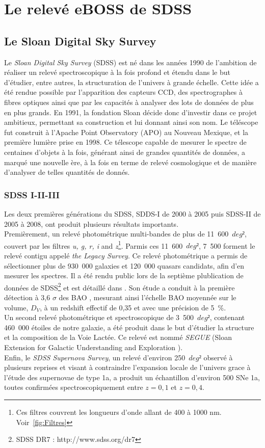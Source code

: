 \documentclass[11pt, twoside, a4paper, openright]{report}
\begin{document}
\chapter{Le relevé eBOSS de SDSS}

\section{Le Sloan Digital Sky Survey}


Le \emph{Sloan Digital Sky Survey} (SDSS) est né dans les années 1990 de l'ambition de réaliser un relevé spectroscopique à la fois profond et étendu dans le but d'étudier, entre autres, la structuration de l'univers à grande échelle. Cette idée a été rendue possible par l'apparition des capteurs CCD, des spectrographes à fibres optiques ainsi que par les capacités à analyser des lots de données de plus en plus grands. En 1991, la fondation Sloan décide donc d'investir dans ce projet ambitieux, permettant sa construction et lui donnant ainsi son nom. 
Le téléscope fut construit à l'Apache Point Observatory (APO) au Nouveau Mexique, et la première lumière prise en 1998. Ce télescope capable de mesurer le spectre de centaines d'objets à la fois, générant ainsi de grandes quantités de données, a marqu\'e une nouvelle ère, à la fois en terme de relevé cosmologique et de manière d'analyser de telles quantités de donnés.

\subsection{SDSS I-II-III}
Les deux premières générations du SDSS, SDDS-I de 2000 à 2005 puis SDSS-II de 2005 à 2008, ont produit plusieurs résultats importants.\\
Premièrement, un relevé photométrique multi-bandes de plus de 11~600~$deg²$, couvert par les filtres \emph{u, g, r, i} and \emph{z}\footnote{Ces filtres couvrent les longueurs d'onde allant de 400 à 1000 nm. Voir~\ref{fig:Filtres}}. Parmis ces 11~600~$deg²$, 7~500 forment le relevé contigu appelé \emph{the Legacy Survey}. Ce relevé photométrique a permis de sélectionner plus de 930~000 galaxies et 120~000 quasars candidats, afin d'en mesurer les spectres. Il a été rendu public lors de la septième plublication de données de SDSS\footnote{SDSS DR7 : http://www.sdss.org/dr7} et est détaillé dans \cite{Abazajian2008}. Son étude a conduit à la première détection à 3,6 $\sigma$ des BAO \cite{Eisenstein2005}, mesurant ainsi l'échelle BAO moyennée sur le volume, $D_V$, à un redshift effectif de 0,35 et avec une précision de 5~\%. \\
Un second relevé photométrique et spectroscopique de 3~500~$deg²$, contenant 460~000 étoiles de notre galaxie, a été produit dans le but d'étudier la structure et la composition de la Voie Lactée. Ce relevé est nommé \emph{SEGUE} (Sloan Extension for Galactic Understanding and Exploration \cite{Collaboration2009}).\\
Enfin, le \emph{SDSS Supernova Survey}, un relevé d'environ 250~$deg²$ observé à plusieurs reprises et visant à contraindre l'expansion locale de l'univers grace à l'étude des supernovae de type 1a, a produit un échantillon d'environ 500 SNe 1a, toutes confirmées spectroscopiquement entre $z=0,1$ et $z=0,4$.
\end{document}

